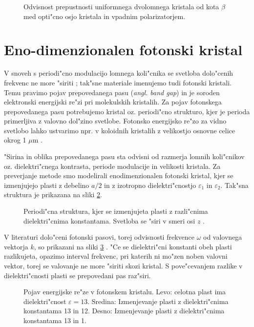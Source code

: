 \documentclass[12pt,twoside,openright,final]{report}
\newcommand{\angl}[1]{(\textit{angl. #1})}
\begin{document}
\begin{figure}[h]
 
 \caption{Odvisnost prepustnosti uniformnega dvolomnega kristala od kota $\beta$ med opti"cno osjo kristala in vpadnim polarizatorjem. }
 \label{fig:test-uniform}
\end{figure}

\section{Eno-dimenzionalen fotonski kristal}
V snoveh s periodi"cno modulacijo lomnega koli"cnika se svetloba dolo"cenih frekvenc ne more "siriti \cite{hecht-nano,joannopoulos}; tak"sne materiale imenujemo tudi fotonski kristali. 
Temu pravimo pojav prepovedanega pasu \angl{band gap} in je soroden elektronski energijski re"zi pri molekulskih kristalih. 
Za pojav fotonskega prepovedanega pasu potrebujemo kristal oz. periodi"cno strukturo, kjer je perioda primerljiva z valovno dol"zino svetlobe. 
Fotonsko energijsko re"zo za vidno svetlobo lahko ustvarimo npr. v koloidnih kristalih z velikostjo osnovne celice okrog 1 $\mu$m \cite{colloidal-photonic-crystals}. 

"Sirina in oblika prepovedanega pasu sta odvisni od razmerja lomnih koli"cnikov oz. dielektri"cnega kontrasta, periode modulacije in velikosti kristala. 
Za preverjanje metode smo modelirali enodimenzionalen fotonski kristal, kjer se izmenjujejo plasti z debelino $a/2$ in z izotropno dielektri"cnostjo $\varepsilon_1$ in $\varepsilon_2$. 
Tak"sna struktura je prikazana na sliki \ref{fig:periodic-structure}. 

\begin{figure}[h]
 \centering
 
 \caption{Periodi"cna struktura, kjer se izmenjujeta plasti z razli"cnima dielektri"cnima konstantama. 
 Svetloba se "siri v smeri osi $z$ \cite{joannopoulos}. }
 \label{fig:periodic-structure}
\end{figure}

V literaturi dolo"ceni fotonski pasovi, torej odvisnosti frekvence $\omega$ od valovnega vektorja $k$, so prikazani na sliki \ref{fig:joannopoulos-crystal} \cite{joannopoulos}. 
"Ce se dielektri"cni konstanti obeh plasti razlikujeta, opazimo interval frekvenc, pri katerih ni mo"zen noben valovni vektor, torej se valovanje ne more "siriti skozi kristal. 
S pove"cevanjem razlike v dielektri"cnosti plasti se prepovedani pas raz"siri. 

\begin{figure}[h]
\centering
  {\footnotesize }
 \caption{Pojav energijske re"ze v fotonskem kristalu. Levo: celotna plast ima dielektri"cnost $\varepsilon = 13$. Sredina: Izmenjevanje plasti z dielektri"cnima konstantama 13 in 12. Desno: Izmenjevanje plasti z dielektri"cnima konstantama 13 in 1. \cite{joannopoulos}}
 \label{fig:joannopoulos-crystal}
\end{figure}
\end{document}
